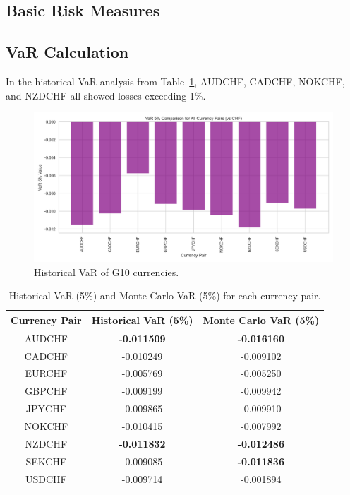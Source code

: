 \documentclass{article}
\begin{document}
\subsection{Basic Risk Measures}

\subsection{VaR Calculation}
In the historical VaR analysis from Table~\ref{table:var}, AUDCHF, CADCHF, NOKCHF, and NZDCHF all showed losses exceeding 1\%. 

\begin{figure}[h]
    \centering
    \includegraphics[width=0.75\linewidth]{reports/figures/var_5_percent_comparison_plot.png}
    \caption{Historical VaR of G10 currencies.}
    \label{fig:historical_VaR}
\end{figure}

\begin{table}[!ht]
    \centering
    \begin{tabular}{|c|c|c|}
    \hline
        Currency Pair & Historical VaR (5\%) & Monte Carlo VaR (5\%) \\ \hline
        AUDCHF & \textbf{-0.011509} & \textbf{-0.016160} \\ \hline
        CADCHF & -0.010249 & -0.009102 \\ \hline
        EURCHF & -0.005769 & -0.005250 \\ \hline
        GBPCHF & -0.009199 & -0.009942 \\ \hline
        JPYCHF & -0.009865 & -0.009910 \\ \hline
        NOKCHF & -0.010415 & -0.007992 \\ \hline
        NZDCHF & \textbf{-0.011832} & \textbf{-0.012486} \\ \hline
        SEKCHF & -0.009085 & \textbf{-0.011836} \\ \hline
        USDCHF & -0.009714 & -0.001894 \\ \hline
    \end{tabular}
    \label{table:var}
    \caption{Historical VaR (5\%) and Monte Carlo VaR (5\%) for each currency pair.}
\end{table}
\end{document}
